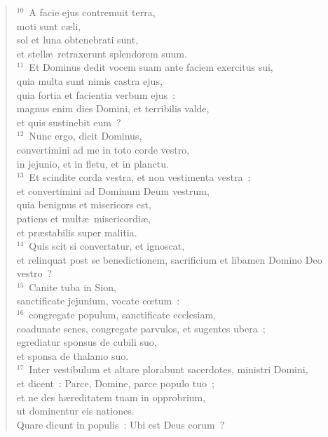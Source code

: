 \begin{verse}
${}^{10}$~A facie ejus contremuit terra,\\ moti sunt c\ae li,\\ sol et luna obtenebrati sunt,\\ et stell\ae\ retraxerunt splendorem suum.\\
${}^{11}$~Et Dominus dedit vocem suam ante faciem exercitus sui,\\ quia multa sunt nimis castra ejus,\\ quia fortia et facientia verbum ejus~:\\ magnus enim dies Domini, et terribilis valde,\\ et quis sustinebit eum~?\\
${}^{12}$~Nunc ergo, dicit Dominus,\\ convertimini ad me in toto corde vestro,\\ in jejunio, et in fletu, et in planctu.\\
${}^{13}$~Et scindite corda vestra, et non vestimenta vestra~;\\ et convertimini ad Dominum Deum vestrum,\\ quia benignus et misericors est,\\ patiens et mult\ae\ misericordi\ae ,\\ et pr\ae stabilis super malitia.\\
${}^{14}$~Quis scit si convertatur, et ignoscat,\\ et relinquat post se benedictionem, sacrificium et libamen Domino Deo vestro~?\\
${}^{15}$~Canite tuba in Sion,\\ sanctificate jejunium, vocate cœtum~:\\
${}^{16}$~congregate populum, sanctificate ecclesiam,\\ coadunate senes, congregate parvulos, et sugentes ubera~;\\ egrediatur sponsus de cubili suo,\\ et sponsa de thalamo suo.\\
${}^{17}$~Inter vestibulum et altare plorabunt sacerdotes, ministri Domini,\\ et dicent~: Parce, Domine, parce populo tuo~;\\ et ne des h\ae reditatem tuam in opprobrium,\\ ut dominentur eis nationes.\\ Quare dicunt in populis~: Ubi est Deus eorum~?\end{verse}


